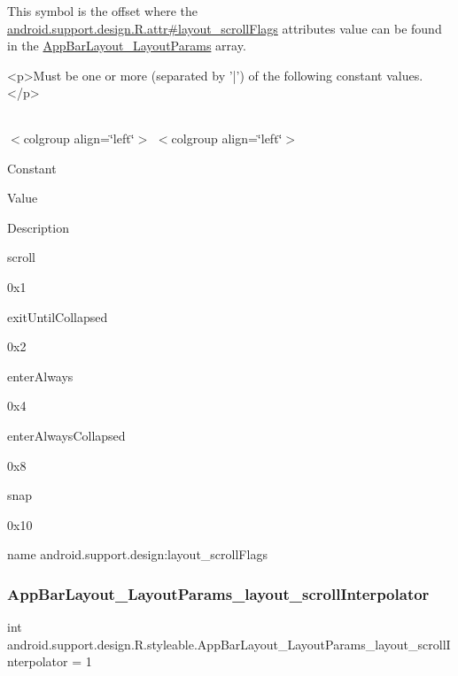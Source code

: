 This symbol is the offset where the \hyperlink{classandroid_1_1support_1_1design_1_1R_1_1attr_ac74bc2945ca7301db9b32f08c4454a7d}{android.\+support.\+design.\+R.\+attr\#layout\+\_\+scroll\+Flags} attribute\textquotesingle{}s value can be found in the \hyperlink{classandroid_1_1support_1_1design_1_1R_1_1styleable_af35cb615b571fb6d447bc930baeae71d}{App\+Bar\+Layout\+\_\+\+Layout\+Params} array.

\begin{DoxyVerb}      <p>Must be one or more (separated by '|') of the following constant values.</p>
\end{DoxyVerb}
 \tabulinesep=1mm
\begin{longtabu} spread 0pt [c]{*{0}{|X[-1]}|}
\hline
\end{longtabu}
$<$colgroup align=\char`\"{}left\char`\"{}$>$ $<$colgroup align=\char`\"{}left\char`\"{}$>$ 

Constant

Value

Description 

{\ttfamily scroll}

0x1

{\ttfamily exit\+Until\+Collapsed}

0x2

{\ttfamily enter\+Always}

0x4

{\ttfamily enter\+Always\+Collapsed}

0x8

{\ttfamily snap}

0x10

name android.\+support.\+design\+:layout\+\_\+scroll\+Flags \mbox{\label{classandroid_1_1support_1_1design_1_1R_1_1styleable_a5f19dcedddd78f620c09f1472fdc29e8}} 
\subsubsection{\texorpdfstring{App\+Bar\+Layout\+\_\+\+Layout\+Params\+\_\+layout\+\_\+scroll\+Interpolator}{AppBarLayout\_LayoutParams\_layout\_scrollInterpolator}}
{\footnotesize\ttfamily int android.\+support.\+design.\+R.\+styleable.\+App\+Bar\+Layout\+\_\+\+Layout\+Params\+\_\+layout\+\_\+scroll\+Interpolator = 1\hspace{0.3cm}{\ttfamily [static]}}

